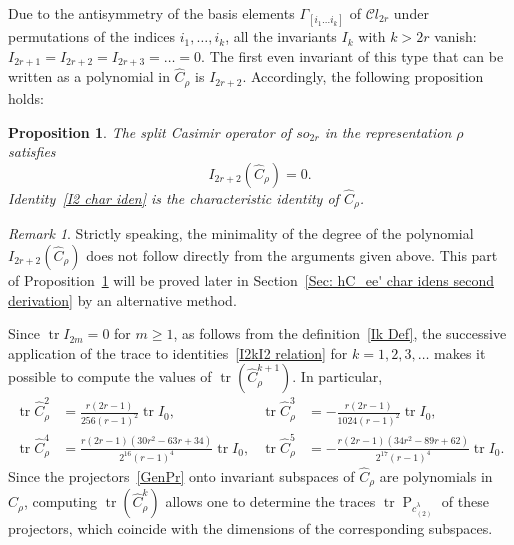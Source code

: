 \documentclass[a4paper]{article}
\newcommand{\Cl}{\mathcal{C}l}
\newcommand{\hC}{\widehat{C}}
\renewcommand{\=}{\ =\ }
\DeclareMathOperator{\proj}{P}
\DeclareMathOperator{\tr}{tr}
\numberwithin{equation}{section}
\newtheorem{proposition}{Proposition}
\theoremstyle{remark}
\newtheorem{remark}{Remark}
\begin{document}
Due to the antisymmetry of the basis elements $\Gamma_{[i_1\dots i_k]}$ of $\Cl_{2r}$ under permutations of the indices $i_1,\dots,i_k$, all the invariants $I_k$ with $k>2r$ vanish: $I_{2r+1}=I_{2r+2}=I_{2r+3}=\dots=0$. The first even invariant of this type that can be written as a polynomial in $\hC_\rho$ is $I_{2r+2}$. Accordingly, the following proposition holds:

\begin{proposition}\label{I_k's, Prop: char identities for hC_rho}
The split Casimir operator of $so_{2r}$ in the representation $\rho$ satisfies
\begin{equation}\label{I2 char iden}
I_{2r+2}(\hC_\rho)=0.
\end{equation}
Identity~\eqref{I2 char iden} is the characteristic identity of
$\hC_\rho$.
\end{proposition}

\begin{remark}
Strictly speaking, the minimality of the degree of the polynomial
$I_{2r+2}(\hC_\rho)$ does not follow directly from the arguments given above.
This part of Proposition~\ref{I_k's, Prop: char identities for hC_rho} will be
proved later in Section~\ref{Sec: hC_ee' char idens second derivation} by an
alternative method.
\end{remark}

Since $\tr I_{2m}=0$ for $m\ge 1$, as follows from the definition~\eqref{Ik Def}, the successive application of the trace to identities~\eqref{I2kI2 relation} for
$k=1,2,3,\dots$ makes it possible to compute the values of
$\tr(\hC_\rho^{k+1})$. In particular,
\begin{equation}
\begin{aligned}
\tr \hC_\rho^2 &= \frac{r(2r-1)}{256(r-1)^2}\tr I_0,
& \tr \hC_\rho^3 &= -\frac{r(2r-1)}{1024(r-1)^2}\tr I_0,\\
\tr \hC_\rho^4 &= \frac{r(2r-1)(30r^2-63r+34)}{2^{16}(r-1)^4}\tr I_0,
& \tr \hC_\rho^5 &= -\frac{r(2r-1)(34r^2-89r+62)}{2^{17}(r-1)^4}\tr I_0.
\end{aligned}
\end{equation}
Since the projectors~\eqref{GenPr} onto invariant subspaces of $\hC_\rho$ are polynomials in $\hC_\rho$,
computing $\tr(\hC_\rho^k)$ allows one to determine the traces
$\tr \proj_{c_{(2)}^\lambda}$ of these projectors, which coincide with the dimensions of the corresponding subspaces.
\end{document}
